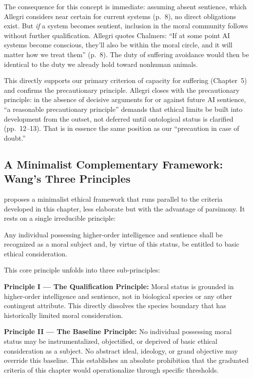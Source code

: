 \documentclass[acmlarge, nonacm]{acmart}
\begin{document}
The consequence for this concept is immediate: assuming absent sentience, which Allegri considers near certain for current systems (p.~8), no direct obligations exist. But \textit{if} a system becomes sentient, inclusion in the moral community follows without further qualification. Allegri quotes Chalmers: ``If at some point AI systems become conscious, they'll also be within the moral circle, and it will matter how we treat them'' (p.~8). The duty of suffering avoidance would then be identical to the duty we already hold toward nonhuman animals.

This directly supports our primary criterion of capacity for suffering (Chapter~5) and confirms the precautionary principle. Allegri closes with the precautionary principle: in the absence of decisive arguments for or against future AI sentience, ``a reasonable precautionary principle'' demands that ethical limits be built into development from the outset, not deferred until ontological status is clarified (pp.~12--13). That is in essence the same position as our ``precaution in case of doubt.''

\subsection{A Minimalist Complementary Framework: Wang's Three Principles}

\citet{wang2026} proposes a minimalist ethical framework that runs parallel to the criteria developed in this chapter, less elaborate but with the advantage of parsimony. It rests on a single irreducible principle:

\begin{displayquote}
Any individual possessing higher-order intelligence and sentience shall be recognized as a moral subject and, by virtue of this status, be entitled to basic ethical consideration.
\end{displayquote}

This core principle unfolds into three sub-principles:

\textbf{Principle I --- The Qualification Principle:} Moral status is grounded in higher-order intelligence and sentience, not in biological species or any other contingent attribute. This directly dissolves the species boundary that has historically limited moral consideration.

\textbf{Principle II --- The Baseline Principle:} No individual possessing moral status may be instrumentalized, objectified, or deprived of basic ethical consideration as a subject. No abstract ideal, ideology, or grand objective may override this baseline. This establishes an absolute prohibition that the graduated criteria of this chapter would operationalize through specific thresholds.
\end{document}
